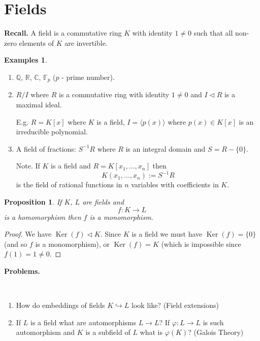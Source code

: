 \documentclass[12pt, letterpaper, oneside]{article}
\theoremstyle{plain}
\newtheorem{proposition}[theorem]{Proposition}
\theoremstyle{definition}
\newtheorem{examples}[theorem]{Examples}
\newcommand{\lra}{\longrightarrow}
\newcommand{\hra}{\hookrightarrow}
\newcommand{\Q}{{\mathbb Q}}
\newcommand{\R}{{\mathbb R}}
\newcommand{\C}{{\mathbb C}}
\newcommand{\F}{{\mathbb F}}
\newcommand{\Ker}{\operatorname{Ker}}
\newcommand{\subgp}[1]{\langle#1\rangle}
\newcommand{\benu}{\begin{enumerate}}
\newcommand{\eenu}{\end{enumerate}}
\newcommand{\vs}{\vskip 5mm}
\newcommand{\isep}[1][0]{\setlength{\itemsep}{#1 mm}}
\begin{document}
\newpage
\section{Fields}
\label{SEC_FIELDS}

\textbf{Recall.} A field is a commutative ring $K$ with identity $1\neq 0$ such that all non-zero elements 
of $K$ are invertible. 

\vs\vs

\begin{examples}
\hfill 
\begin{enumerate}
\isep[5]

\item $\Q$, $\R$, $\C$, $\F_{p}$ ($p$ - prime number). 

\item $R/I$ where $R$ is a commutative ring with identity $1\neq 0$ and $I\lhd R$ is a maximal ideal.

E.g. $R= K[x]$ where $K$ is a field, $I = \subgp{p(x)}$ where $p(x)\in K[x]$ is an irreducible polynomial. 

\item A field of fractions: $S^{-1}R$ where $R$ is an integral domain and $S = R- \{0\}$.

Note. If $K$ is a field and $R = K[x_{1}, \dots, x_{n}]$  then 
$$K(x_{1}, \dots, x_{n}) := S^{-1}R$$
is the field of rational functions in $n$ variables with coefficients in $K$.


\end{enumerate}
\end{examples}


\vs\vs

\begin{proposition}
If $K$, $L$ are fields and 
$$f\colon K \lra L$$
is a homomorphism then $f$ is a monomorphism. 
\end{proposition}


\vs

\begin{proof}
We have $\Ker(f) \lhd K$. Since $K$ is a field we must have $\Ker(f) = \{0\}$ (and so $f$
is a monomorphism), or $\Ker(f) = K$ (which is impossible since $f(1) = 1\neq 0$.
\end{proof}


\vs\vs\vs\vs


\textbf{Problems.}

\vskip -13mm

\ 
\benu
\item How do embeddings of fields $K \hra L$ look like? (Field extensions)
\item If $L$ is a field what are automorphisms $L \to L$? If $\varphi \colon L \to L$
is such automorphism and $K$ is a subfield of $L$ what is $\varphi(K)$? (Galois Theory)
\eenu
\end{document}
